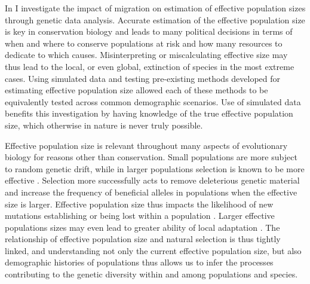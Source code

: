In  I investigate the impact of migration on estimation of effective population sizes through genetic data analysis. Accurate estimation of the effective population size is key in conservation biology and leads to many political decisions in terms of when and where to conserve populations at risk and how many resources to dedicate to which causes. Misinterpreting or miscalculating effective size may thus lead to the local, or even global, extinction of species in the most extreme cases. Using simulated data and testing pre-existing methods developed for estimating effective population size allowed each of these methods to be equivalently tested across common demographic scenarios. Use of simulated data benefits this investigation by having knowledge of the true effective population size, which otherwise in nature is never truly possible.



Effective population size is relevant throughout many aspects of evolutionary biology for reasons other than conservation. Small populations are more subject to random genetic drift, while in larger populations selection is known to be more effective \citep{Gravel:2016}. Selection more successfully acts to remove deleterious genetic material and increase the frequency of beneficial alleles in populations when the effective size is larger. Effective population size thus impacts the likelihood of new mutations establishing or being lost within a population \citep{Kimura:1962, Whitlock:2000}. Larger effective populations sizes may even lead to greater ability of local adaptation \citep{Leimu:2008}. The relationship of effective population size and natural selection is thus tightly linked, and understanding not only the current effective population size, but also demographic histories of populations thus allows us to infer the processes contributing to the genetic diversity within and among populations and species.

